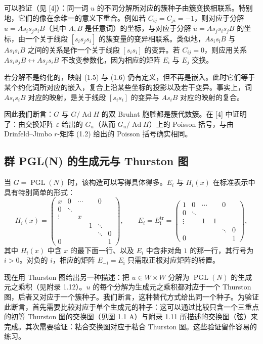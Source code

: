 可以验证（见 [4]）：同一词 $u$ 的不同分解所对应的簇种子由簇变换相联系。特别地，它们的像在余维一的意义下重合。例如若 $C_{ij}=C_{ji}=-1$，则对应于分解 $u=As_is_js_iB$（其中 $A,B$ 是任意词）的坐标，与对应于分解 $\tilde u=As_js_is_jB$ 的坐标，由一个关于线段 $[s_is_js_i]$ 的簇变量的变异相联系。类似地，$As_is_{\bar\imath}B$ 与 $As_{\bar\imath}s_iB$ 之间的关系是作一个关于线段 $[s_is_{\bar\imath}]$ 的变异。若 $C_{ij}=0$，则应用关系 $As_is_jB\leftrightarrow As_js_iB$ 不改变参数化，因为相应的矩阵 $E_i$ 与 $E_j$ 交换。

若分解不是约化的，映射 (1.5) 与 (1.6) 仍有定义，但不再是嵌入。此时它们等于某个约化词所对应的嵌入，复合上沿某些坐标的投影以及若干变异。事实上，词 $As_is_iB$ 对应的映射，是关于线段 $[s_is_i]$ 的变异与 $As_iB$ 对应的映射的复合。

因此我们断言：$G$ 与 $G/\operatorname{Ad}H$ 的双 Bruhat 胞腔都是簇代数簇。在 [4] 中证明了：由交换矩阵 $\varepsilon$ 给出的 $G_u$（从而 $G_u/\operatorname{Ad}H$）上的 Poisson 括号，与由 Drinfeld--Jimbo $r$-矩阵 (1.2) 给出的 Poisson 括号确实相同。

\subsection{群 PGL(N) 的生成元与 Thurston 图}

当 $G=\operatorname{PGL}(N)$ 时，该构造可以写得具体得多。$E_i$ 与 $H_i(x)$ 在标准表示中具有特别简单的形式：
\begin{equation}\label{eq:1.7}
H_i(x)=
\begin{pmatrix}
x&0&\cdots&&0\\
0&\ddots&&&&\\
\vdots&&x&&&\\
&&&1&\ddots&\\
&&&&\ddots&0\\
0&&&&&1
\end{pmatrix},
\qquad
E_i=E_{\bar\imath}^{\mathrm{tr}}=
\begin{pmatrix}
1&0&\cdots&&0\\
0&\ddots&&&&\\
\vdots&&1&1&&\\
&&&&\ddots&0\\
0&&&&&1
\end{pmatrix},
\tag{1.7}
\end{equation}
其中 $H_i(x)$ 中含 $x$ 的最下面一行、以及 $E_i$ 中含非对角 $1$ 的那一行，其行号为 $i>0$。对负的 $i$，相应的矩阵 $E_{-i}=E_{\bar\imath}$ 只需取正根对应矩阵的转置。

现在用 Thurston 图给出另一种描述：把 $u\in W\times W$ 分解为 $\operatorname{PGL}(N)$ 的生成元之乘积（见附录 1.12）。$u$ 的每个分解为生成元之乘积都对应于一个 Thurston 图，后者又对应于一个簇种子。我们断言，这种替代方式给出同一个种子。为验证此断言，首先需要比较对应于单个生成元的种子：这可以通过比较只含一个三重点的初等 Thurston 图的交换图（见图 1.1 A）与附录 1.11 所描述的交换图（弦）来完成。其次需要验证：粘合交换图对应于粘合 Thurston 图。这些验证留作容易的练习。

